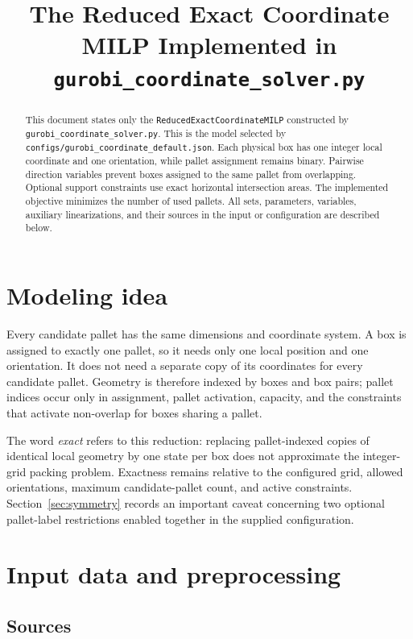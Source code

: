 \documentclass[11pt]{article}
\title{The Reduced Exact Coordinate MILP Implemented in\\
\texttt{gurobi\_coordinate\_solver.py}}
\author{}
\date{}
\begin{document}
\maketitle

\begin{abstract}
This document states only the \texttt{ReducedExactCoordinateMILP} constructed
by \texttt{gurobi\_coordinate\_solver.py}.  This is the model selected by
\texttt{configs/gurobi\_coordinate\_default.json}.  Each physical box has one
integer local coordinate and one orientation, while pallet assignment remains
binary.  Pairwise direction variables prevent boxes assigned to the same
pallet from overlapping.  Optional support constraints use exact horizontal
intersection areas.  The implemented objective minimizes the number of used
pallets.  All sets, parameters, variables, auxiliary linearizations, and their
sources in the input or configuration are described below.
\end{abstract}

\section{Modeling idea}

Every candidate pallet has the same dimensions and coordinate system.  A box
is assigned to exactly one pallet, so it needs only one local position and one
orientation.  It does not need a separate copy of its coordinates for every
candidate pallet.  Geometry is therefore indexed by boxes and box pairs;
pallet indices occur only in assignment, pallet activation, capacity, and the
constraints that activate non-overlap for boxes sharing a pallet.

The word \emph{exact} refers to this reduction: replacing pallet-indexed copies
of identical local geometry by one state per box does not approximate the
integer-grid packing problem.  Exactness remains relative to the configured
grid, allowed orientations, maximum candidate-pallet count, and active
constraints.  Section~\ref{sec:symmetry} records an important caveat concerning
two optional pallet-label restrictions enabled together in the supplied
configuration.

\section{Input data and preprocessing}

\subsection{Sources}
\end{document}
